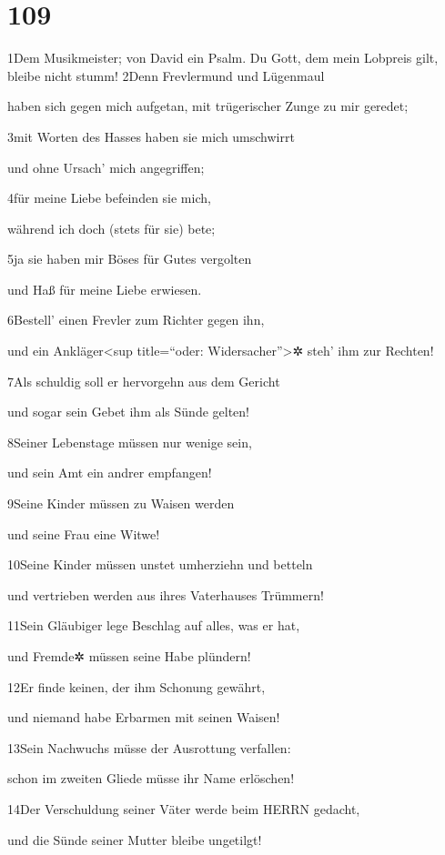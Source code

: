 \hypertarget{section-108}{%
\section{109}\label{section-108}}

1Dem Musikmeister; von David ein Psalm. Du Gott, dem mein Lobpreis gilt,
bleibe nicht stumm! 2Denn Frevlermund und Lügenmaul

haben sich gegen mich aufgetan, mit trügerischer Zunge zu mir geredet;

3mit Worten des Hasses haben sie mich umschwirrt

und ohne Ursach' mich angegriffen;

4für meine Liebe befeinden sie mich,

während ich doch (stets für sie) bete;

5ja sie haben mir Böses für Gutes vergolten

und Haß für meine Liebe erwiesen.

6Bestell' einen Frevler zum Richter gegen ihn,

und ein Ankläger\textless sup title=``oder: Widersacher''\textgreater✲
steh' ihm zur Rechten!

7Als schuldig soll er hervorgehn aus dem Gericht

und sogar sein Gebet ihm als Sünde gelten!

8Seiner Lebenstage müssen nur wenige sein,

und sein Amt ein andrer empfangen!

9Seine Kinder müssen zu Waisen werden

und seine Frau eine Witwe!

10Seine Kinder müssen unstet umherziehn und betteln

und vertrieben werden aus ihres Vaterhauses Trümmern!

11Sein Gläubiger lege Beschlag auf alles, was er hat,

und Fremde✲ müssen seine Habe plündern!

12Er finde keinen, der ihm Schonung gewährt,

und niemand habe Erbarmen mit seinen Waisen!

13Sein Nachwuchs müsse der Ausrottung verfallen:

schon im zweiten Gliede müsse ihr Name erlöschen!

14Der Verschuldung seiner Väter werde beim HERRN gedacht,

und die Sünde seiner Mutter bleibe ungetilgt!

